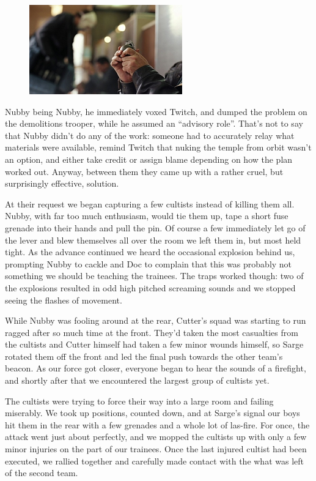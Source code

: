 \begin{figure}
	\begin{center}
		\includegraphics[width=\figwidth]{pics/8/40.png}
	\end{center}
\end{figure}
Nubby being Nubby, he immediately voxed Twitch, and dumped the problem on the demolitions trooper, while he assumed an “advisory role”. 
That’s not to say that Nubby didn’t do any of the work: 
someone had to accurately relay what materials were available, remind Twitch that nuking the temple from orbit wasn’t an option, and either take credit or assign blame depending on how the plan worked out. 
Anyway, between them they came up with a rather cruel, but surprisingly effective, solution.

At their request we began capturing a few cultists instead of killing them all. 
Nubby, with far too much enthusiasm, would tie them up, tape a short fuse grenade into their hands and pull the pin. 
Of course a few immediately let go of the lever and blew themselves all over the room we left them in, but most held tight. 
As the advance continued we heard the occasional explosion behind us, prompting Nubby to cackle and Doc to complain that this was probably not something we should be teaching the trainees. 
The traps worked though: 
two of the explosions resulted in odd high pitched screaming sounds and we stopped seeing the flashes of movement. 


While Nubby was fooling around at the rear, Cutter’s squad was starting to run ragged after so much time at the front. 
They’d taken the most casualties from the cultists and Cutter himself had taken a few minor wounds himself, so Sarge rotated them off the front and led the final push towards the other team’s beacon. 
As our force got closer, everyone began to hear the sounds of a firefight, and shortly after that we encountered the largest group of cultists yet.

The cultists were trying to force their way into a large room and failing miserably. 
We took up positions, counted down, and at Sarge’s signal our boys hit them in the rear with a few grenades and a whole lot of las-fire. 
For once, the attack went just about perfectly, and we mopped the cultists up with only a few minor injuries on the part of our trainees. 
Once the last injured cultist had been executed, we rallied together and carefully made contact with the what was left of the second team.

